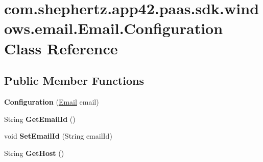 \hypertarget{classcom_1_1shephertz_1_1app42_1_1paas_1_1sdk_1_1windows_1_1email_1_1_email_1_1_configuration}{\section{com.\+shephertz.\+app42.\+paas.\+sdk.\+windows.\+email.\+Email.\+Configuration Class Reference}
\label{classcom_1_1shephertz_1_1app42_1_1paas_1_1sdk_1_1windows_1_1email_1_1_email_1_1_configuration}
}
\subsection*{Public Member Functions}
\begin{DoxyCompactItemize}
\item 
\hypertarget{classcom_1_1shephertz_1_1app42_1_1paas_1_1sdk_1_1windows_1_1email_1_1_email_1_1_configuration_ac7235cf439c86ef31c9f10e099ba3701}{{\bfseries Configuration} (\hyperlink{classcom_1_1shephertz_1_1app42_1_1paas_1_1sdk_1_1windows_1_1email_1_1_email}{Email} email)}\label{classcom_1_1shephertz_1_1app42_1_1paas_1_1sdk_1_1windows_1_1email_1_1_email_1_1_configuration_ac7235cf439c86ef31c9f10e099ba3701}

\item 
\hypertarget{classcom_1_1shephertz_1_1app42_1_1paas_1_1sdk_1_1windows_1_1email_1_1_email_1_1_configuration_a318f0c19fb70bd274efe83fef22f5e90}{String {\bfseries Get\+Email\+Id} ()}\label{classcom_1_1shephertz_1_1app42_1_1paas_1_1sdk_1_1windows_1_1email_1_1_email_1_1_configuration_a318f0c19fb70bd274efe83fef22f5e90}

\item 
\hypertarget{classcom_1_1shephertz_1_1app42_1_1paas_1_1sdk_1_1windows_1_1email_1_1_email_1_1_configuration_a0e0ae6cf7149b362469a04e82e166b28}{void {\bfseries Set\+Email\+Id} (String email\+Id)}\label{classcom_1_1shephertz_1_1app42_1_1paas_1_1sdk_1_1windows_1_1email_1_1_email_1_1_configuration_a0e0ae6cf7149b362469a04e82e166b28}

\item 
\hypertarget{classcom_1_1shephertz_1_1app42_1_1paas_1_1sdk_1_1windows_1_1email_1_1_email_1_1_configuration_a752d8bb1a6a62ea1a14fb0389d62a028}{String {\bfseries Get\+Host} ()}\label{classcom_1_1shephertz_1_1app42_1_1paas_1_1sdk_1_1windows_1_1email_1_1_email_1_1_configuration_a752d8bb1a6a62ea1a14fb0389d62a028}


\end{DoxyCompactItemize}
